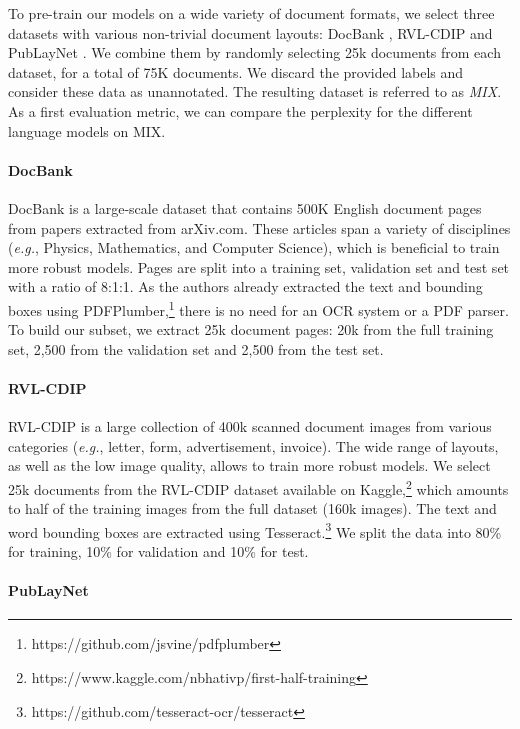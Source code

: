 To pre-train our models on a wide variety of document formats, we select three datasets with various non-trivial document layouts: DocBank \citep{li2020docbank}, RVL-CDIP \citep{harley2015evaluation} and PubLayNet \citep{zhong2019publaynet}. We combine them by randomly selecting 25k documents from each dataset, for a total of 75K documents. We discard the provided labels and consider these data as unannotated. The resulting dataset is referred to as \textit{MIX}. As a first evaluation metric, we can compare the perplexity for the different language models on MIX. 

\paragraph{DocBank}

DocBank is a large-scale dataset that contains 500K English document pages from papers extracted from arXiv.com. These articles span a variety of disciplines (\textit{e.g.}, Physics, Mathematics, and Computer Science), which is beneficial to train more robust models. Pages are split into a training set, validation set and test set with a ratio of 8:1:1. As the authors already extracted the text and bounding boxes using PDFPlumber,\footnote{https://github.com/jsvine/pdfplumber} there is no need for an OCR system or a PDF parser. To build our subset, we extract 25k document pages: 20k from the full training set, 2,500 from the validation set and 2,500 from the test set. 

\paragraph{RVL-CDIP}

RVL-CDIP is a large collection of 400k scanned document images from various categories (\textit{e.g.}, letter, form, advertisement, invoice). The wide range of layouts, as well as the low image quality, allows to train more robust models. We select 25k documents from the RVL-CDIP dataset available on Kaggle,\footnote{https://www.kaggle.com/nbhativp/first-half-training} which amounts to half of the training images from the full dataset (160k images). The text and word bounding boxes are extracted using Tesseract.\footnote{https://github.com/tesseract-ocr/tesseract} We split the data into 80\% for training, 10\% for validation and 10\% for test.

\paragraph{PubLayNet}

